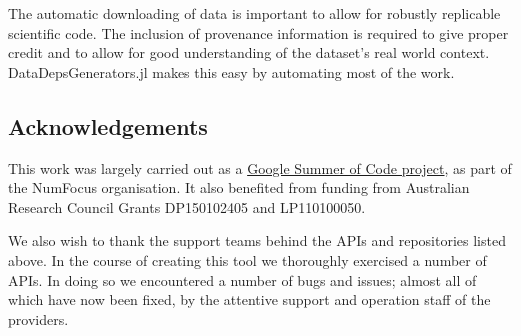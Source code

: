 \documentclass{book}
\begin{document}
The automatic downloading of data is important to allow for robustly
replicable scientific code. The inclusion of provenance information is
required to give proper credit and to allow for good understanding of
the dataset's real world context. DataDepsGenerators.jl makes this easy
by automating most of the work.

\hypertarget{acknowledgements}{%
\subsection{Acknowledgements}\label{acknowledgements}}

This work was largely carried out as a
\href{https://medium.com/@sebastinsanty/google-summer-of-code-2018-julia-computing-report-8d3f553d7050}{Google
Summer of Code project}, as part of the NumFocus organisation. It also
benefited from funding from Australian Research Council Grants
DP150102405 and LP110100050.

We also wish to thank the support teams behind the APIs and repositories
listed above. In the course of creating this tool we thoroughly
exercised a number of APIs. In doing so we encountered a number of bugs
and issues; almost all of which have now been fixed, by the attentive
support and operation staff of the providers.
\end{document}
